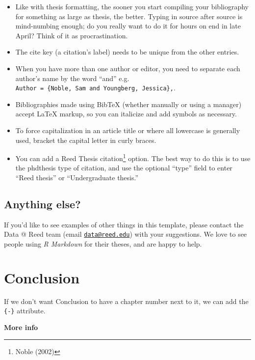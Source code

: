 \documentclass[12pt,twoside]{reedthesis}
\providecommand{\tightlist}{%
  \setlength{\itemsep}{0pt}\setlength{\parskip}{0pt}}
\theoremstyle{definition}
\theoremstyle{definition}
\theoremstyle{remark}
\begin{document}
  \begin{itemize}
  \tightlist
  \item
    Like with thesis formatting, the sooner you start compiling your
    bibliography for something as large as thesis, the better. Typing in
    source after source is mind-numbing enough; do you really want to do
    it for hours on end in late April? Think of it as procrastination.
  \item
    The cite key (a citation's label) needs to be unique from the other
    entries.
  \item
    When you have more than one author or editor, you need to separate
    each author's name by the word ``and'' e.g.
    \texttt{Author\ =\ \{Noble,\ Sam\ and\ Youngberg,\ Jessica\},}.
  \item
    Bibliographies made using BibTeX (whether manually or using a manager)
    accept LaTeX markup, so you can italicize and add symbols as
    necessary.
  \item
    To force capitalization in an article title or where all lowercase is
    generally used, bracket the capital letter in curly braces.
  \item
    You can add a Reed Thesis citation\footnote{Noble (2002)} option. The
    best way to do this is to use the phdthesis type of citation, and use
    the optional ``type'' field to enter ``Reed thesis'' or
    ``Undergraduate thesis.''
  \end{itemize}
  
  \section{Anything else?}\label{anything-else}
  
  If you'd like to see examples of other things in this template, please
  contact the Data @ Reed team (email
  \href{mailto:data@reed.edu}{\nolinkurl{data@reed.edu}}) with your
  suggestions. We love to see people using \emph{R Markdown} for their
  theses, and are happy to help.
  
  \chapter*{Conclusion}\label{conclusion}
  
  If we don't want Conclusion to have a chapter number next to it, we can
  add the \texttt{\{-\}} attribute.
  
  \textbf{More info}
  
\end{document}
